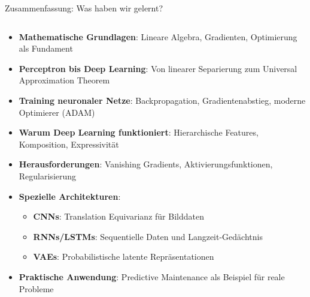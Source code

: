 \documentclass[aspectratio=1610, xcolor=dvipsnames, 9pt]{beamer}
\begin{document}
\begin{frame}{Zusammenfassung: Was haben wir gelernt?}
  \begin{columns}
    \begin{column}{1\textwidth}
      \begin{itemize}
        \item \textbf{Mathematische Grundlagen}: Lineare Algebra, Gradienten, Optimierung als Fundament
        \item \textbf{Perceptron bis Deep Learning}: Von linearer Separierung zum Universal Approximation Theorem
        \item \textbf{Training neuronaler Netze}: Backpropagation, Gradientenabstieg, moderne Optimierer (ADAM)
        \item \textbf{Warum Deep Learning funktioniert}: Hierarchische Features, Komposition, Expressivität
        \item \textbf{Herausforderungen}: Vanishing Gradients, Aktivierungsfunktionen, Regularisierung
        \item \textbf{Spezielle Architekturen}:
        \begin{itemize}
          \item \textbf{CNNs}: Translation Equivarianz für Bilddaten
          \item \textbf{RNNs/LSTMs}: Sequentielle Daten und Langzeit-Gedächtnis
          \item \textbf{VAEs}: Probabilistische latente Repräsentationen
        \end{itemize}
        \item \textbf{Praktische Anwendung}: Predictive Maintenance als Beispiel für reale Probleme
      \end{itemize}
    \end{column}
  \end{columns}
\end{frame}
\end{document}
